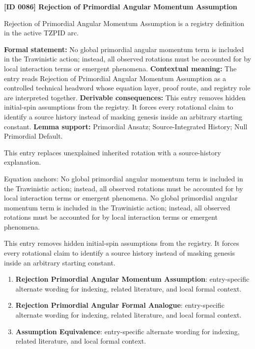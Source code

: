 \clearpage
\noindent\textbf{[ID 0086] Rejection of Primordial Angular Momentum Assumption}\par
\vspace{0.35em}
\begingroup\small
{}
Rejection of Primordial Angular Momentum Assumption is a registry definition in the active TZPID arc.

\begingroup\footnotesize\setlength{\emergencystretch}{3em}\sloppy
\textbf{Formal statement:} No global primordial angular momentum term is included in the Trawinistic action; instead, all observed rotations must be accounted for by local interaction terms or emergent phenomena. \textbf{Contextual meaning:} The entry reads Rejection of Primordial Angular Momentum Assumption as a controlled technical headword whose equation layer, proof route, and registry role are interpreted together. \textbf{Derivable consequences:} This entry removes hidden initial-spin assumptions from the registry. It forces every rotational claim to identify a source history instead of masking genesis inside an arbitrary starting constant. \textbf{Lemma support:} Primordial Ansatz; Source-Integrated History; Null Primordial Default.\par
\endgroup

This entry replaces unexplained inherited rotation with a source-history explanation.

Equation anchors: No global primordial angular momentum term is included in the Trawinistic action; instead, all observed rotations must be accounted for by local interaction terms or emergent phenomena. No global primordial angular momentum term is included in the Trawinistic action; instead, all observed rotations must be accounted for by local interaction terms or emergent phenomena.

This entry removes hidden initial-spin assumptions from the registry. It forces every rotational claim to identify a source history instead of masking genesis inside an arbitrary starting constant.
\endgroup

\begingroup\footnotesize\sloppy
\begin{enumerate}[leftmargin=1.35em,itemsep=1pt,topsep=1pt,parsep=0pt]
\item \textbf{Rejection Primordial Angular Momentum Assumption}: entry-specific alternate wording for indexing, related literature, and local formal context.
\item \textbf{Rejection Primordial Angular Formal Analogue}: entry-specific alternate wording for indexing, related literature, and local formal context.
\item \textbf{Assumption Equivalence}: entry-specific alternate wording for indexing, related literature, and local formal context.
\end{enumerate}
\endgroup

